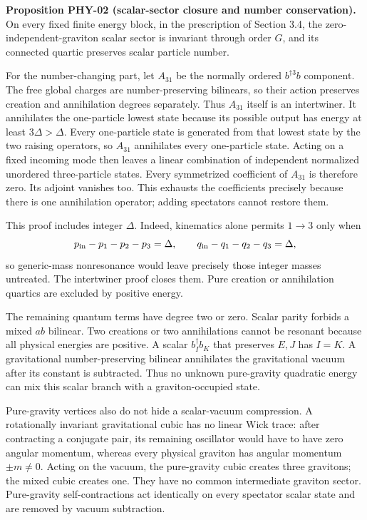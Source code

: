 \textbf{Proposition PHY-02 (scalar-sector closure and number conservation).} On every fixed finite energy block, in the prescription of Section 3.4, the zero-independent-graviton scalar sector is invariant through order \(G\), and its connected quartic preserves scalar particle number.

For the number-changing part, let \(A_{31}\) be the normally ordered \(b^{\dagger3}b\) component. The free global charges are number-preserving bilinears, so their action preserves creation and annihilation degrees separately. Thus \(A_{31}\) itself is an intertwiner. It annihilates the one-particle lowest state because its possible output has energy at least \(3\Delta>\Delta\). Every one-particle state is generated from that lowest state by the two raising operators, so \(A_{31}\) annihilates every one-particle state. Acting on a fixed incoming mode then leaves a linear combination of independent normalized unordered three-particle states. Every symmetrized coefficient of \(A_{31}\) is therefore zero. Its adjoint vanishes too. This exhausts the coefficients precisely because there is one annihilation operator; adding spectators cannot restore them.

This proof includes integer \(\Delta\). Indeed, kinematics alone permits \(1\to3\) only when \[
p_{\rm in}-p_1-p_2-p_3=\Delta,\qquad
q_{\rm in}-q_1-q_2-q_3=\Delta ,
\] so generic-mass nonresonance would leave precisely those integer masses untreated. The intertwiner proof closes them. Pure creation or annihilation quartics are excluded by positive energy.

The remaining quantum terms have degree two or zero. Scalar parity forbids a mixed \(a b\) bilinear. Two creations or two annihilations cannot be resonant because all physical energies are positive. A scalar \(b_I^\dagger b_K\) that preserves \(E,J\) has \(I=K\). A gravitational number-preserving bilinear annihilates the gravitational vacuum after its constant is subtracted. Thus no unknown pure-gravity quadratic energy can mix this scalar branch with a graviton-occupied state.

Pure-gravity vertices also do not hide a scalar-vacuum compression. A rotationally invariant gravitational cubic has no linear Wick trace: after contracting a conjugate pair, its remaining oscillator would have to have zero angular momentum, whereas every physical graviton has angular momentum \(\pm m\ne0\). Acting on the vacuum, the pure-gravity cubic creates three gravitons; the mixed cubic creates one. They have no common intermediate graviton sector. Pure-gravity self-contractions act identically on every spectator scalar state and are removed by vacuum subtraction.

